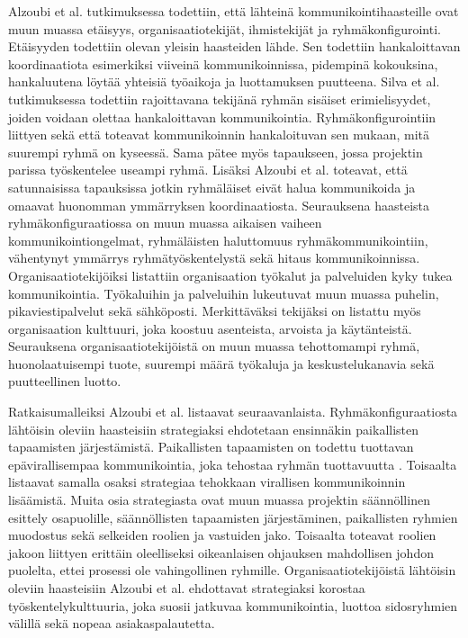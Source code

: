 Alzoubi et al. tutkimuksessa \cite{ALZOUBI201622} todettiin, että lähteinä kommunikointihaasteille ovat muun muassa etäisyys, organisaatiotekijät, ihmistekijät ja ryhmäkonfigurointi. Etäisyyden todettiin olevan yleisin haasteiden lähde. Sen todettiin hankaloittavan koordinaatiota esimerkiksi viiveinä kommunikoinnissa, pidempinä kokouksina, hankaluutena löytää yhteisiä työaikoja ja luottamuksen puutteena. Silva et al. tutkimuksessa \cite{SELLERISILVA201520} todettiin rajoittavana tekijänä ryhmän sisäiset erimielisyydet, joiden voidaan olettaa hankaloittavan kommunikointia. Ryhmäkonfigurointiin liittyen sekä \cite{SELLERISILVA201520} että \cite{ALZOUBI201622} toteavat kommunikoinnin hankaloituvan sen mukaan, mitä suurempi ryhmä on kyseessä. Sama pätee myös tapaukseen, jossa projektin parissa työskentelee useampi ryhmä. Lisäksi Alzoubi et al. \cite{ALZOUBI201622} toteavat, että satunnaisissa tapauksissa jotkin ryhmäläiset eivät halua kommunikoida ja omaavat huonomman ymmärryksen koordinaatiosta. Seurauksena haasteista ryhmäkonfiguraatiossa on muun muassa aikaisen vaiheen kommunikointiongelmat, ryhmäläisten haluttomuus ryhmäkommunikointiin, vähentynyt ymmärrys ryhmätyöskentelystä sekä hitaus kommunikoinnissa. Organisaatiotekijöiksi listattiin organisaation työkalut ja palveluiden kyky tukea kommunikointia. Työkaluihin ja palveluihin lukeutuvat muun muassa puhelin, pikaviestipalvelut sekä sähköposti. Merkittäväksi tekijäksi on listattu myös organisaation kulttuuri, joka koostuu asenteista, arvoista ja käytänteistä. Seurauksena organisaatiotekijöistä on muun muassa tehottomampi ryhmä, huonolaatuisempi tuote, suurempi määrä työkaluja ja keskustelukanavia sekä puutteellinen luotto.

Ratkaisumalleiksi Alzoubi et al. \cite{ALZOUBI201622} listaavat seuraavanlaista. Ryhmäkonfiguraatiosta lähtöisin oleviin haasteisiin strategiaksi ehdotetaan ensinnäkin paikallisten tapaamisten järjestämistä. Paikallisten tapaamisten on todettu tuottavan epävirallisempaa kommunikointia, joka tehostaa ryhmän tuottavuutta \cite{DEOMELO2013412}. Toisaalta \cite{ALZOUBI201622} listaavat samalla osaksi strategiaa tehokkaan virallisen kommunikoinnin lisäämistä. Muita osia strategiasta ovat muun muassa projektin säännöllinen esittely osapuolille, säännöllisten tapaamisten järjestäminen, paikallisten ryhmien muodostus sekä selkeiden roolien ja vastuiden jako. Toisaalta \cite{CLAPS201521} toteavat roolien jakoon liittyen erittäin oleelliseksi oikeanlaisen ohjauksen mahdollisen johdon puolelta, ettei prosessi ole vahingollinen ryhmille. Organisaatiotekijöistä lähtöisin oleviin haasteisiin Alzoubi et al. \cite{ALZOUBI201622} ehdottavat strategiaksi korostaa työskentelykulttuuria, joka suosii jatkuvaa kommunikointia, luottoa sidosryhmien välillä sekä nopeaa asiakaspalautetta. 

